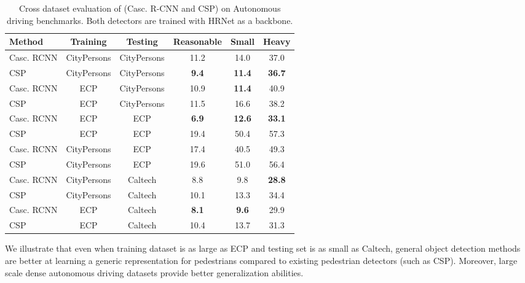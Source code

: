 \documentclass[final]{cvpr}
\newcommand{\caltecha}[1]{{Caltech}}
\newcommand{\ecpa}[1]{{ECP}}
\begin{document}
\begin{table*}[tb]
\centering
\caption{Cross dataset evaluation of (Casc. R-CNN and CSP) on Autonomous driving benchmarks. Both detectors are trained with HRNet as a backbone.}
\label{tab:cross-cp-ecp-cal}
\begin{tabular}{l|c|c|c|c|c}
\hline
Method & Training   & Testing          & Reasonable & Small & Heavy \\ \hline
Casc. RCNN & CityPersons & CityPersons  & {11.2}  & 14.0     & {37.0} \\ \hline
CSP & CityPersons & CityPersons  & \textbf{9.4}  & \textbf{11.4}     & \textbf{36.7} \\ \hline
Casc. RCNN  & ECP   & CityPersons&  {10.9} & \textbf{11.4}     & 40.9\\ \hline
CSP & ECP   & CityPersons&  {11.5} & {16.6}     & 38.2\\ \hline
\hline 
Casc. RCNN  & ECP    &ECP& \textbf{6.9}  & \textbf{12.6}     & \textbf{33.1} \\ \hline
CSP & ECP    &ECP& {19.4}  & {50.4}     & {57.3} \\ \hline
Casc. RCNN & CityPersons & ECP   &  17.4 & 40.5     & 49.3\\ \hline
CSP & CityPersons & ECP   &  19.6 & 51.0     & 56.4\\ \hline
\hline 
Casc. RCNN & CityPersons & Caltech  & 8.8    &  9.8    & \textbf{28.8} \\ \hline
CSP & CityPersons & Caltech  & 10.1    &  13.3    & {34.4} \\ \hline
Casc. RCNN & ECP & Caltech& \textbf{8.1}   & \textbf{9.6}   & 29.9 \\ \hline
CSP & ECP & Caltech&10.4   & 13.7   & 31.3 \\ \hline
\end{tabular}
\end{table*}





We illustrate that even when training dataset is as large as \ecpa{} and testing set is as small as \caltecha{}, general object detection methods are better at learning a generic representation for pedestrians compared to existing pedestrian detectors (such as CSP\cite{Liu2018DBC}). Moreover, large scale dense autonomous driving datasets provide better generalization abilities.  
\end{document}
